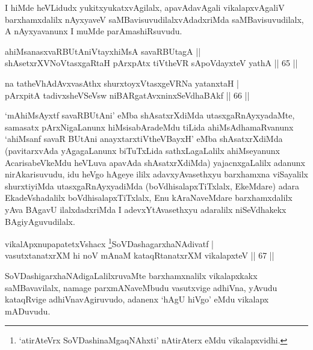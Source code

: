 \begin{artha}
I hiMde heVLidudx yukitxyukatxvAgilalx, apavAdavAgali vikalapxvAgaliV barxhamxdalilx nAyxyaveV saMBavisuvudilalxvAdadxriMda saMBavisuvudilalx, A nAyxyavanunx I muMde parAmashiRsuvudu.
\end{artha}


\begin{shl}
ahiMsanasxvaRBUtAniVtayxhiMsA savaRBUtagA ||  \\
shAsetxrXVNoVtasxgaRtaH pArxpAtx tiVtheVR sA\s poVdayxteV yathA \hfill||  65 ||  
\end{shl}

\begin{shl}
na tatheVhAdAvxvasAthx shurxtoyxVtasxgeVRNa yatanxtaH  | \\
pArxpitA tadivxsheVSeV\s sw niBARgatAvxninxSeVdhaBAkf \hfill ||  66 ||  
\end{shl}

\begin{artha}
`mAhiMsAyxtf savaRBUtAni' eMba shAsatxrXdiMda utasxgaRnAyxyadaMte, samasatx pArxNigaLanunx hiMsisabAradeMdu tiLida ahiMsAdhamaRvanunx `ahiMsanf savaR BUtAni anayxtarxtiVtheVBayxH' eMba shAsatxrXdiMda (pavitarxvAda yAgagaLanunx biTuTxLida sathxLagaLalilx ahiMseyanunx AcarisabeVkeMdu heVLuva apavAda shAsatxrXdiMda) yajacnxgaLalilx adanunx nirAkarisuvudu, idu heVgo hAgeye ililx adavxyAvasethxyu barxhamxna viSayalilx shurxtiyiMda utasxgaRnAyxyadiMda (boVdhisalapxTiTxlalx, EkeMdare) adara EkadeVshadalilx boVdhisalapxTiTxlalx, Enu kAraNaveMdare barxhamxdalilx yAva BAgavU ilalxdadxriMda I adevxYtAvasethxyu adaralilx niSeVdhakekx BAgiyAguvudilalx.
\end{artha}



\begin{shl}
vikalApxnupapatetxVshacx \footnote{`atirAteVrx SoVDashinaMgaqNAhxti' nAtirAterx eMdu vikalapxvidhi.}SoVDashagarxhaNAdivatf  | \\
vasutxtanatxrXM hi noV mAnaM kataqRtanatxrXM vikalapxteV \hfill ||  67 ||  
\end{shl}

\begin{artha}
SoVDashigarxhaNAdigaLalilxruvaMte barxhamxnalilx vikalapxkakx saMBavavilalx, namage parxmANaveMbudu vasutxvige adhiVna, yAvudu kataqRvige adhiVnavAgiruvudo, adanenx `hAgU hiVgo' eMdu vikalapx mADuvudu.
\end{artha}

